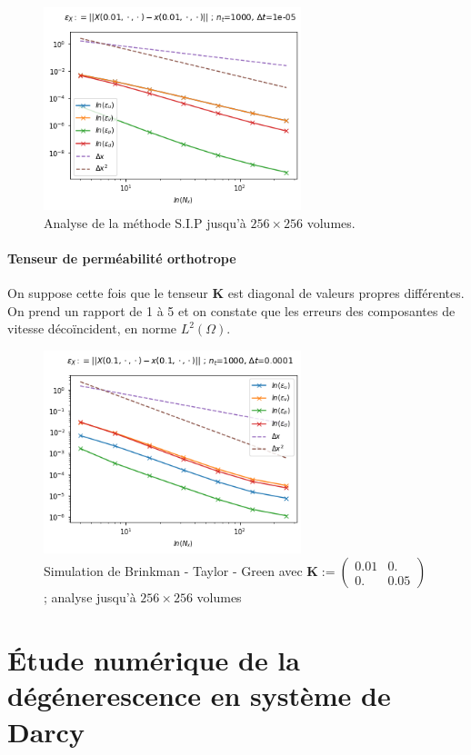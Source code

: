 \begin{figure}[htp]
    \centering
    \includegraphics[width=7.5cm]{Images/brinkman/spherique/erreurs (5).png}
    \caption{Analyse de la méthode S.I.P jusqu'à $256 \times 256$ volumes.}
\end{figure}

\newpage

\paragraph{Tenseur de perméabilité orthotrope} On suppose cette fois que le tenseur $\mathbf{K}$ est diagonal de valeurs propres différentes. On prend un rapport de 1 à 5 et on constate que les erreurs des composantes de vitesse décoïncident, en norme $L^2(\Omega)$.
\begin{figure}[htp]
    \centering
    \includegraphics[width=7.5cm]{Images/brinkman/elliptique/erreurs (6), Kxx = .01, Kyy = .05.png}
    \caption{Simulation de Brinkman - Taylor - Green avec $\mathbf{K} := \begin{pmatrix} 0.01 & 0. \\ 0. & 0.05 \end{pmatrix}$ ; analyse jusqu'à $256\times 256$ volumes}
\end{figure}

\section{\'Etude numérique de la dégénerescence en système de Darcy}

